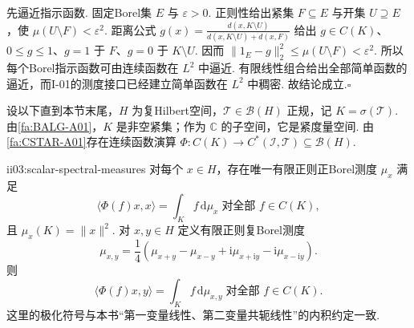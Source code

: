 \begin{FAProof}
先逼近指示函数. 固定Borel集 \(\displaystyle E\) 与 \(\displaystyle\varepsilon>0\). 正则性给出紧集 \(\displaystyle F\subseteq E\) 与开集 \(\displaystyle U\supseteq E\)，使
\(\displaystyle \mu(U\setminus F)<\varepsilon^2.\)
距离公式
\(\displaystyle g(x)=\frac{d(x,K\setminus U)}{d(x,K\setminus U)+d(x,F)}\)
给出 \(\displaystyle g\in C(K)\)、\(\displaystyle0\leqslant g\leqslant1\)、\(\displaystyle g=1\) 于 \(\displaystyle F\)、\(\displaystyle g=0\) 于 \(\displaystyle K\setminus U\). 因而
\(\displaystyle \|1_E-g\|_2^2 \leqslant\mu(U\setminus F) <\varepsilon^2.\)
所以每个Borel指示函数可由连续函数在 \(\displaystyle L^2\) 中逼近. 有限线性组合给出全部简单函数的逼近，而I-01的测度接口已经建立简单函数在 \(\displaystyle L^2\) 中稠密. 故结论成立.\hfill\(\square\)
\end{FAProof}

设以下直到本节末尾，\(\displaystyle H\) 为复Hilbert空间，\(\displaystyle\mathcal T\in\mathcal B(H)\) 正规，记
\(\displaystyle K=\sigma(\mathcal T).\)
由\autoref{fa:BALG-A01}，\(\displaystyle K\) 是非空紧集；作为 \(\displaystyle\mathbb C\) 的子空间，它是紧度量空间. 由\autoref{fa:CSTAR-A01}存在连续函数演算
\(\displaystyle \Phi:C(K)\longrightarrow C^*(\mathcal I,\mathcal T)\subseteq\mathcal B(H).\)

\begin{FAProposition}[B][标量谱测度与极化]{ii03:scalar-spectral-measures}
对每个 \(\displaystyle x\in H\)，存在唯一有限正则正Borel测度 \(\displaystyle\mu_x\) 满足
\[
\langle\Phi(f)x,x\rangle
=\int_K f\,\mathrm{d}\mu_x
\;\text{对全部 }f\in C(K),
\]
且 \(\displaystyle\mu_x(K)=\|x\|^2\). 对 \(\displaystyle x,y\in H\) 定义有限正则复Borel测度
\[
\mu_{x,y}
=\frac14\left(
\mu_{x+y}-\mu_{x-y}
+\mathrm{i}\mu_{x+\mathrm{i}y}
-\mathrm{i}\mu_{x-\mathrm{i}y}
\right).
\]
则
\[
\langle\Phi(f)x,y\rangle
=\int_K f\,\mathrm{d}\mu_{x,y}
\;\text{对全部 }f\in C(K).
\]
这里的极化符号与本书“第一变量线性、第二变量共轭线性”的内积约定一致.
\end{FAProposition}

